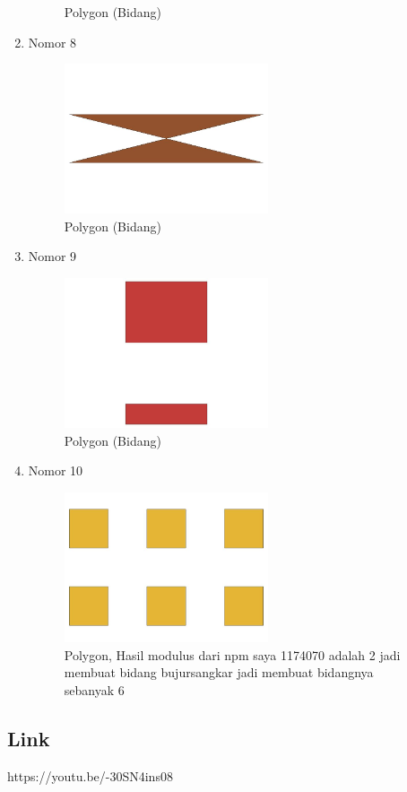 \begin{enumerate}
\begin{figure}[H]
		\centering
		\caption{Polygon (Bidang)}
	\end{figure}
	\item Nomor 8
	
	\begin{figure}[H]
		\includegraphics[width=6cm]{figures/Tugas2/1174070/No8.jpeg}
		\centering
		\caption{Polygon (Bidang)}
	\end{figure}
	\item Nomor 9
	
	\begin{figure}[H]
		\includegraphics[width=6cm]{figures/Tugas2/1174070/No9.jpeg}
		\centering
		\caption{Polygon (Bidang)}
	\end{figure}
	\item Nomor 10
	
	\begin{figure}[H]
		\includegraphics[width=6cm]{figures/Tugas2/1174070/No10.jpeg}
		\centering
		\caption{Polygon, Hasil modulus dari npm saya 1174070 adalah 2 jadi membuat bidang bujursangkar jadi membuat bidangnya sebanyak 6}
	\end{figure}
\end{enumerate}
\subsection{Link}
https://youtu.be/-30SN4ins08